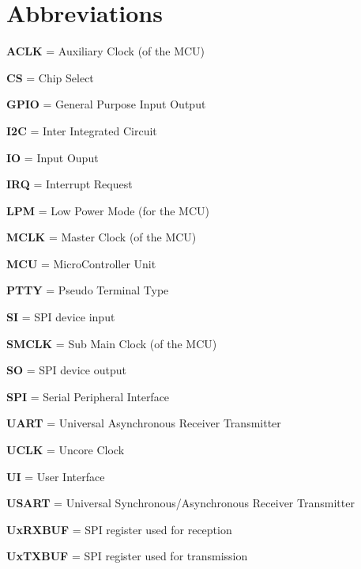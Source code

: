 \documentclass[a4paper,10pt]{report}
\begin{document}
\section{Abbreviations}
\begin{description}
  \item \textbf{ACLK} = Auxiliary Clock (of the MCU)
  \item \textbf{CS} = Chip Select
  \item \textbf{GPIO} = General Purpose Input Output
  \item \textbf{I2C} = Inter Integrated Circuit
  \item \textbf{IO} = Input Ouput
  \item \textbf{IRQ} = Interrupt Request
  \item \textbf{LPM} = Low Power Mode (for the MCU)
  \item \textbf{MCLK} = Master Clock (of the MCU)
  \item \textbf{MCU} = MicroController Unit
  \item \textbf{PTTY} = Pseudo Terminal Type
  \item \textbf{SI} = SPI device input
  \item \textbf{SMCLK} = Sub Main Clock (of the MCU)
  \item \textbf{SO} = SPI device output
  \item \textbf{SPI} = Serial Peripheral Interface
  \item \textbf{UART} = Universal Asynchronous Receiver Transmitter
  \item \textbf{UCLK} = Uncore Clock
  \item \textbf{UI} = User Interface
  \item \textbf{USART} = Universal Synchronous/Asynchronous Receiver Transmitter
  \item \textbf{UxRXBUF} = SPI register used for reception
  \item \textbf{UxTXBUF} = SPI register used for transmission
\end{description}
\end{document}
